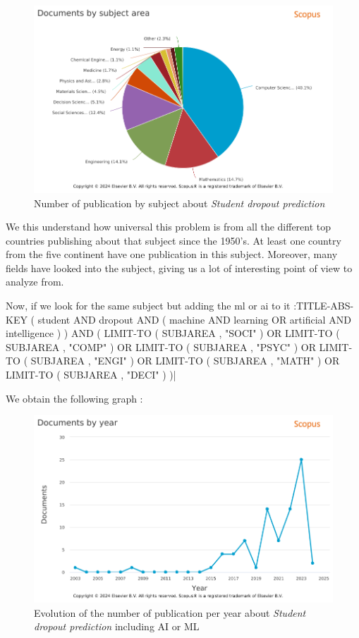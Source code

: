 \documentclass[../../main.tex]{subfiles}
\begin{document}
\begin{figure}[H]
    \centering
    \includegraphics[width=1\linewidth]{res//graph/prediction student/Scopus-Analyze-Subject.png}
    \caption{Number of publication by subject about \textit{Student dropout prediction}}
    \label{fig:nb_pub_scopus_predictstudent_subject}
\end{figure}

We this understand how universal this problem is from all the different top countries publishing about that subject since the 1950's. At least one country from the five continent have one publication in this subject. Moreover, many fields have looked into the subject, giving us a lot of interesting point of view to analyze from.

Now, if we look for the same subject but adding the \acrshort{ml} or \acrshort{ai} to it :TITLE-ABS-KEY ( student  AND  dropout  AND  ( machine  AND  learning  OR  artificial  AND  intelligence ) )  AND  ( LIMIT-TO ( SUBJAREA ,  "SOCI" )  OR  LIMIT-TO ( SUBJAREA ,  "COMP" )  OR  LIMIT-TO ( SUBJAREA ,  "PSYC" )  OR  LIMIT-TO ( SUBJAREA ,  "ENGI" )  OR  LIMIT-TO ( SUBJAREA ,  "MATH" )  OR  LIMIT-TO ( SUBJAREA ,  "DECI" ) )|

We obtain the following graph :
\begin{figure}[H]
    \centering
    \includegraphics[width=1\linewidth]{res//graph/prediction student with AI/PredictingStudentDropoutW_AI_ML.png}
    \caption{Evolution of the number of publication per year about \textit{Student dropout prediction} including AI or ML}
    \label{fig:nb_pub_scopus_predictstudent_AI}
\end{figure}
\end{document}
